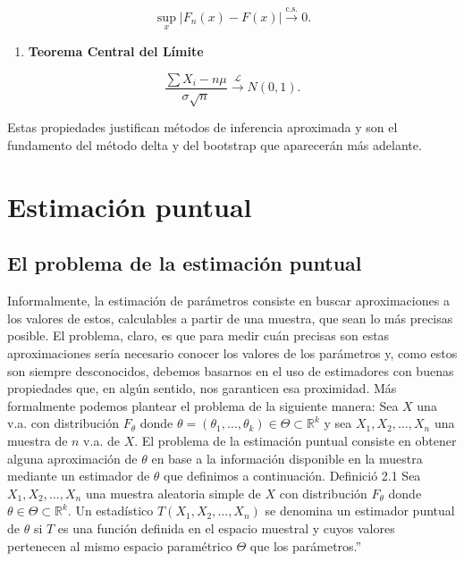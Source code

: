 \documentclass[
]{article}
\providecommand{\tightlist}{%
  \setlength{\itemsep}{0pt}\setlength{\parskip}{0pt}}
\begin{document}
\[
\sup_x |F_n(x)-F(x)| \xrightarrow{\text{c.s.}} 0.
\]

\begin{enumerate}
\def\labelenumi{\arabic{enumi}.}
\setcounter{enumi}{3}
\tightlist
\item
  \textbf{Teorema Central del Límite}
\end{enumerate}

\[
\frac{\sum X_i - n\mu}{\sigma\sqrt{n}}
\xrightarrow{\mathcal{L}} N(0,1).
\]

Estas propiedades justifican métodos de inferencia aproximada y son el fundamento del método delta y del bootstrap que aparecerán más adelante.

\newpage

\section{Estimación puntual}\label{estimaciuxf3n-puntual}

\subsection{El problema de la estimación puntual}\label{el-problema-de-la-estimaciuxf3n-puntual}

Informalmente, la estimación de parámetros consiste en buscar aproximaciones a los valores de estos, calculables a partir de una muestra, que sean lo más precisas posible. El problema, claro, es que para medir cuán precisas son estas aproximaciones sería necesario conocer los valores de los parámetros y, como estos son siempre desconocidos, debemos basarnos en el uso de estimadores con buenas propiedades que, en algún sentido, nos garanticen esa proximidad.
Más formalmente podemos plantear el problema de la siguiente manera:
Sea \(X\) una v.a. con distribución \(F_{\theta}\) donde \(\theta=\left(\theta_{1}, \ldots, \theta_{k}\right) \in \Theta \subset \mathbb{R}^{k}\) y sea \(X_{1}, X_{2}, \ldots, X_{n}\) una muestra de \(n\) v.a. de \(X\). El problema de la estimación puntual consiste en obtener alguna aproximación de \(\theta\) en base a la información disponible en la muestra mediante un estimador de \(\theta\) que definimos a continuación.
Definició 2.1 Sea \(X_{1}, X_{2}, \ldots, X_{n}\) una muestra aleatoria simple de \(X\) con distribución \(F_{\theta}\) donde \(\theta \in \Theta \subset \mathbb{R}^{k}\). Un estadístico \(T\left(X_{1}, X_{2}, \ldots, X_{n}\right)\) se denomina un estimador puntual de \(\theta\) si \(T\) es una función definida en el espacio muestral y cuyos valores pertenecen al mismo espacio paramétrico \(\Theta\) que los parámetros.''
\end{document}
